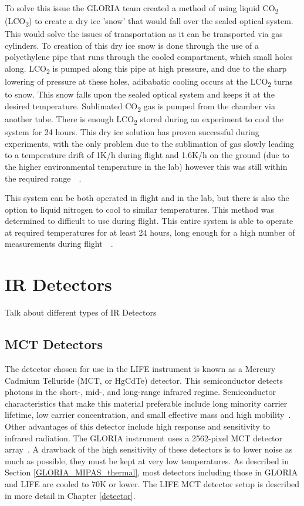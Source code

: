 To solve this issue the GLORIA team created a method of using liquid CO\textsubscript{2} (LCO\textsubscript{2}) to create a dry ice 'snow' that would fall over the sealed optical system. This would solve the issues of transportation as it can be transported via gas cylinders. To creation of this dry ice snow is done through the use of a polyethylene pipe that runs through the cooled compartment, which small holes along. LCO\textsubscript{2} is pumped along this pipe at high pressure, and due to the sharp lowering of pressure at these holes, adibabatic cooling occurs at the LCO\textsubscript{2} turns to snow. This snow falls upon the sealed optical system and keeps it at the desired temperature. Sublimated CO\textsubscript{2} gas is pumped from the chamber via another tube. There is enough LCO\textsubscript{2} stored during an experiment to cool the system for 24 hours. This dry ice solution has proven successful during experiments, with the only problem due to the sublimation of gas slowly leading to a temperature drift of 1K/h during flight and 1.6K/h on the ground (due to the higher environmental temperature in the lab) however this was still within the required range~\citep{GLORIA_concept}~\citep{GLORIA_thermalmech}.

This system can be both operated in flight and in the lab, but there is also the option to liquid nitrogen to cool to similar temperatures. This method was determined to difficult to use during flight. This entire system is able to operate at required temperatures for at least 24 hours, long enough for a high number of measurements during flight~\citep{GLORIA_concept}~\citep{GLORIA_thermalmech}.

\section{IR Detectors}
Talk about different types of IR Detectors

\subsection{MCT Detectors}
The detector chosen for use in the LIFE instrument is known as a Mercury Cadmium Telluride (MCT, or HgCdTe) detector. This semiconductor detects photons in the short-, mid-, and long-range infrared regime. Semiconductor characteristics that make this material preferable include long minority carrier lifetime, low carrier concentration, and small effective mass and high mobility~\citep{MCT_Detectors}. Other advantages of this detector include high response and sensitivity to infrared radiation. The GLORIA instrument uses a 2562-pixel MCT detector array~\citep{GLORIA_concept}. A drawback of the high sensitivity of these detectors is to lower noise as much as possible, they must be kept at very low temperatures. As described in Section \ref{GLORIA_MIPAS_thermal}, most detectors including those in GLORIA and LIFE are cooled to 70K or lower. The LIFE MCT detector setup is described in more detail in Chapter \ref{detector}.

